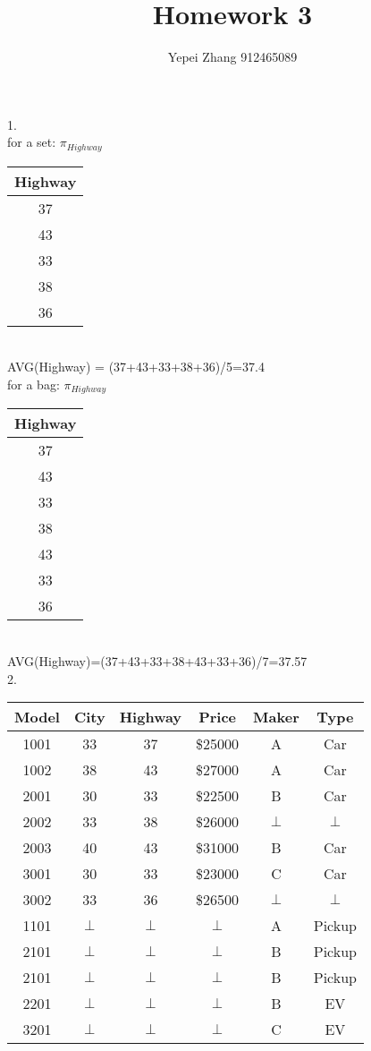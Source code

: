 \documentclass[11pt, oneside]{article}   	%
\title{Homework 3}
\author{Yepei Zhang 912465089}
\begin{document}
\maketitle

1.\\
for a set: $\pi_{Highway}$\\
\begin{tabular}{|c|}
\hline
Highway  \\
\hline
37\\
43\\
33\\
38\\
36\\
\hline
\end{tabular}\\
AVG(Highway) = (37+43+33+38+36)/5=37.4\\

for a bag: $\pi_{Highway}$\\
\begin{tabular}{|c|}
\hline
Highway  \\
\hline
37\\
43\\
33\\
38\\
43\\
33\\
36\\
\hline
\end{tabular}\\
AVG(Highway)=(37+43+33+38+43+33+36)/7=37.57\\

2.\\
\begin{tabular}{|c|c|c|c|c|c|}
\hline
Model & City & Highway & Price & Maker & Type  \\
\hline
1001 & 33  & 37 & \$25000 & A & Car  \\
1002 & 38  & 43 & \$27000 & A & Car  \\
2001 & 30  & 33 & \$22500 & B & Car  \\
2002 & 33  & 38 & \$26000 & $\perp$ & $\perp$  \\
2003 & 40  & 43 & \$31000 & B & Car  \\
3001 & 30  & 33 & \$23000 & C & Car  \\
3002 & 33  & 36 & \$26500 & $\perp$ & $\perp$  \\
1101 & $\perp$  & $\perp$ & $\perp$ & A & Pickup  \\
2101 & $\perp$  & $\perp$ & $\perp$ & B & Pickup  \\
2101 & $\perp$  & $\perp$ & $\perp$ & B & Pickup  \\
2201 & $\perp$  & $\perp$ & $\perp$ & B & EV  \\
3201 & $\perp$  & $\perp$ & $\perp$ & C & EV  \\
\hline
\end{tabular}\\
\end{document}
